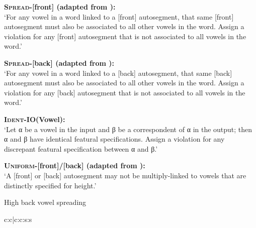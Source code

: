 \documentclass[output=paper,colorlinks,citecolor=brown]{langscibook}
\begin{document}
\begin{exe} 
		\ex \label{constr}
			\begin{xlist}
				\ex \textbf{\textsc{Spread}-[front] (adapted from \cite{Walker2001}):} \\
                    ‘For any vowel in a word linked to a [front] autosegment, that same [front] autosegment must also be associated to all other vowels in the word. Assign a  violation for any [front] autosegment that is not associated to all vowels in the word.'

                    \ex  \textbf{\textsc{Spread}-[back] (adapted from \cite{Walker2001}):}\\
                    ‘For any vowel in a word linked to a [back] autosegment, that same [back] autosegment must also be associated to all other vowels in the word. Assign a violation for any [back] autosegment that is not associated to all vowels in the  word.’

                    \ex \textbf{\textsc{Ident}-IO(Vowel):}\\
                    ‘Let α be a vowel in the input and β be a correspondent of α in the output; then α and β have identical featural specifications. Assign a violation for any discrepant featural specification between α and β.’

                    \ex \textbf{\textsc{Uniform}-[front]/[back] (adapted from \cite{Walker2001}):}\\
                    ‘A [front] or [back] autosegment may not be multiply-linked to vowels that are distinctly  specified for height.’
			\end{xlist}
	\end{exe}


\begin{table}
\caption{High back vowel spreading}
\label{highback}
\begin{center}
\ShadingOn
\TipaOn
\begin{tableau}{c:c|c:c:s:s} 
  \const*{\rotatebox{90}{*O2L1]σ}}       
\cand{[ʃukr]}              \vio{*!}  \vio{}  \vio{}    \vio{}   \vio{}  \vio{}
\cand [\Optimal]{[ʃu.kurˤ]} \vio{}   \vio{}   \vio{}   \vio{}  \vio{*}  \vio{*}
\cand{[ʃu.kir]}             \vio{}    \vio{} \vio{*!}  \vio{}  \vio{*}  \vio{*}
\cand{[ʃi.kir]}             \vio{}    \vio{*!} \vio{}  \vio{}  \vio{*}  \vio{*}
\cand{[ʃu.kor]}             \vio{}    \vio{}   \vio{}  \vio{*!}  \vio{*}  \vio{*}
\end{tableau}
\end{center}

\end{table}
\end{document}
